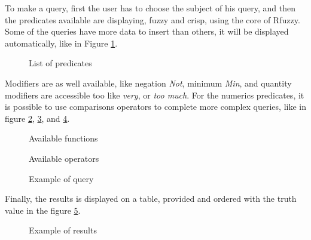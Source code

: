 \documentclass[a4paper,twoside]{article}
\begin{document}
To make a query, first the user has to choose the subject of his query, and then the predicates available are displaying, fuzzy and crisp, using the core of Rfuzzy. Some of the queries have more data to insert than others, it will be displayed automatically, like in Figure \ref{fig:predicate}.\\

\begin{figure}[!h]
  \centering
   {}
  \caption{List of predicates}
  \label{fig:predicate}
 \end{figure}

Modifiers are as well available, like negation \textit{Not}, minimum \textit{Min}, and quantity modifiers are accessible too like \textit{very}, or \textit{too much}. For the numerics predicates, it is possible to use comparisons operators to complete more complex queries, like in figure \ref{fig:min}, \ref{fig:op}, and \ref{fig:query}.\\

\begin{figure}[H]
  \centering
   {}
  \caption{Available functions}
  \label{fig:min}
 \end{figure}

\begin{figure}[H]
  \centering
   {}
  \caption{Available operators }
  \label{fig:op}
 \end{figure}

\begin{figure}[H]
  \centering
   {}
  \caption{Example of query}
  \label{fig:query}
 \end{figure}


Finally, the results is displayed on a table, provided and ordered with the truth value in the figure \ref{fig:results}.

\begin{figure}[H]
  \centering
   {}
  \caption{Example of results}
  \label{fig:results}
 \end{figure}

\newpage
\end{document}
